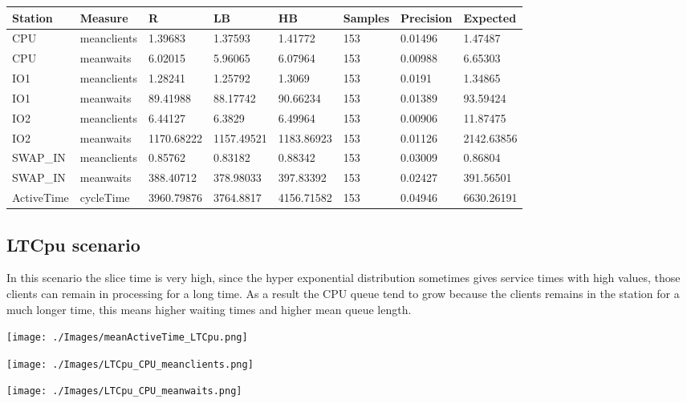 \documentclass[12pt,a4paper]{article}
\begin{document}
\begin{table}[!ht]
    \centering
    \begin{tabular}{|l|l|l|l|l|l|l|l|}
    \hline
        Station & Measure & R & LB & HB & Samples & Precision & Expected \\ \hline
        CPU & meanclients & 1.39683 & 1.37593 & 1.41772 & 153 & 0.01496 & 1.47487 \\ \hline
        CPU & meanwaits & 6.02015 & 5.96065 & 6.07964 & 153 & 0.00988 & 6.65303 \\ \hline
        IO1 & meanclients & 1.28241 & 1.25792 & 1.3069 & 153 & 0.0191 & 1.34865 \\ \hline
        IO1 & meanwaits & 89.41988 & 88.17742 & 90.66234 & 153 & 0.01389 & 93.59424 \\ \hline
        IO2 & meanclients & 6.44127 & 6.3829 & 6.49964 & 153 & 0.00906 & 11.87475 \\ \hline
        IO2 & meanwaits & 1170.68222 & 1157.49521 & 1183.86923 & 153 & 0.01126 & 2142.63856 \\ \hline
        SWAP\_IN & meanclients & 0.85762 & 0.83182 & 0.88342 & 153 & 0.03009 & 0.86804 \\ \hline
        SWAP\_IN & meanwaits & 388.40712 & 378.98033 & 397.83392 & 153 & 0.02427 & 391.56501 \\ \hline
        ActiveTime & cycleTime & 3960.79876 & 3764.8817 & 4156.71582 & 153 & 0.04946 & 6630.26191 \\ \hline
    \end{tabular}
\end{table}


\subsection{LTCpu scenario}

In this scenario the slice time is very high, since the hyper exponential distribution sometimes gives service times with high values, those clients can remain in processing for a long time. As a result the CPU queue tend to grow because the clients remains in the station for a much longer time, this means higher waiting times and higher mean queue length.

\texttt{[image: ./Images/meanActiveTime\_LTCpu.png]}


\texttt{[image: ./Images/LTCpu\_CPU\_meanclients.png]}


\texttt{[image: ./Images/LTCpu\_CPU\_meanwaits.png]}
\end{document}
